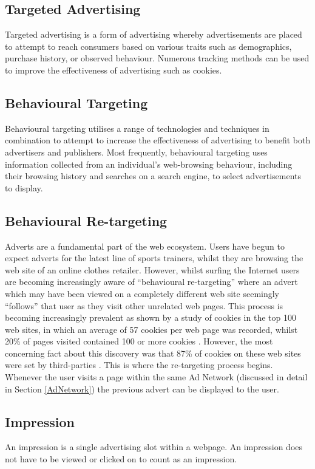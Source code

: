 \documentclass[12pt]{article}
\begin{document}
\subsection{Targeted Advertising}
Targeted advertising is a form of advertising whereby advertisements are placed to attempt to reach consumers based on various traits such as demographics, purchase history, or observed behaviour. Numerous tracking methods can be used to improve the effectiveness of advertising such as cookies. 

\subsection{Behavioural Targeting}
Behavioural targeting utilises a range of technologies and techniques in combination to attempt to increase the effectiveness of advertising to benefit both advertisers and publishers. Most frequently, behavioural targeting uses information collected from an individual’s web-browsing behaviour, including their browsing history and searches on a search engine, to select advertisements to display. 

\subsection{Behavioural Re-targeting}
Adverts are a fundamental part of the web ecosystem. Users have begun to expect adverts for the latest line of sports trainers, whilst they are browsing the web site of an online clothes retailer. However, whilst surfing the Internet users are becoming increasingly aware of ``behavioural re-targeting'' where an advert which may have been viewed on a completely different web site seemingly ``follows'' that user as they visit other unrelated web pages. This process is becoming increasingly prevalent as shown by a study of cookies in the top 100 web sites, in which an average of 57 cookies per web page was recorded, whilst 20\% of pages visited contained 100 or more cookies \parencite{taOffer}. However, the most concerning fact about this discovery was that 87\% of cookies on these web sites were set by third-parties \parencite{taOffer}. This is where the re-targeting process begins. Whenever the user visits a page within the same Ad Network (discussed in detail in Section \ref{AdNetwork}) the previous advert can be displayed to the user.

\subsection{Impression}
An impression is a single advertising slot within a webpage. An impression does not have to be viewed or clicked on to count as an impression. 
\end{document}
